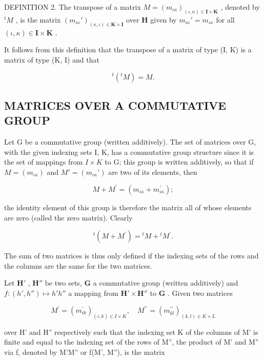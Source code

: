 DEFINITION 2. The transpose of a matrix \(M = (m_{\iota \kappa})_{(\iota, \kappa) \in \mathbf{I} \times \mathbf{K}}\) , denoted by \({}^tM\) , is the matrix \((m_{\kappa \iota}')_{(\kappa, \iota) \in \mathbf{K} \times \mathbf{I}}\) over \(\mathbf{H}\) given by \(m_{\kappa \iota}' = m_{\iota \kappa}\) for all \((\iota, \kappa) \in \mathbf{I} \times \mathbf{K}\) .

It follows from this definition that the transpose of a matrix of type (I, K) is a matrix of type (K, I) and that

\[
{ } ^ { t } ( { } ^ { t } M ) = M .\tag{1}
\]

\subsection{MATRICES OVER A COMMUTATIVE GROUP}

Let G be a commutative group (written additively). The set of matrices over G, with the given indexing sets I, K, has a commutative group structure since it is the set of mappings from \(I \times K\) to G; this group is written additively, so that if \(M = (m_{\iota\kappa})\) and \(M' = (m_{\iota\kappa}')\) are two of its elements, then

\[
M + M ^ {\prime} = (m _ {\iota \kappa} + m _ {\iota \kappa} ^ {\prime});
\]

the identity element of this group is therefore the matrix all of whose elements are zero (called the zero matrix). Clearly

\[
{ } ^ { t } ( M + M ^ { \prime } ) = { } ^ { t } M + { } ^ { t } M ^ { \prime } .\tag{2}
\]

The sum of two matrices is thus only defined if the indexing sets of the rows and the columns are the same for the two matrices.

Let \(\mathbf{H}'\) , \(\mathbf{H}''\) be two sets, \(\mathbf{G}\) a commutative group (written additively) and \(f: (h', h'') \mapsto h'h''\) a mapping from \(\mathbf{H}' \times \mathbf{H}''\) to \(\mathbf{G}\) . Given two matrices

\[
M ^ {\prime} = \left(m _ {i k} ^ {\prime}\right) _ {(i, k) \in I \times K}, \quad M ^ {\prime \prime} = \left(m _ {k l} ^ {\prime \prime}\right) _ {(k, l) \in K \times L}
\]

over H' and H'' respectively such that the indexing set K of the columns of M' is finite and equal to the indexing set of the rows of M'', the product of M' and M'' via f, denoted by M'M'' or f(M', M''), is the matrix

